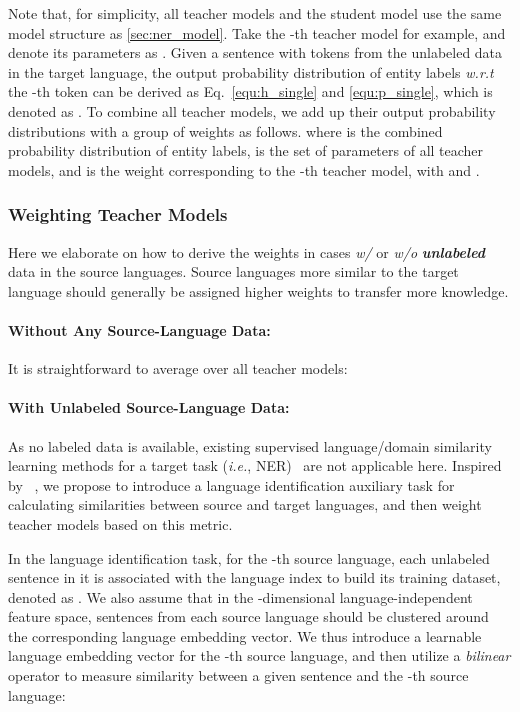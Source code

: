 \documentclass[11pt,a4paper]{article}
\newcommand\ie{\textit{i.e.}}
\newcommand\wrt{\textit{w.r.t}}
\begin{document}
	Note that, for simplicity, all teacher models and the student model use the same model structure as \ref{sec:ner_model}. 
	Take the -th teacher model for example, and denote its parameters as . Given a sentence  with  tokens from the unlabeled data  in the target language, the output probability distribution of entity labels \wrt{} the -th token  can be derived as Eq.~\ref{equ:h_single} and \ref{equ:p_single}, which is denoted as .
To combine all teacher models, we add up their output probability distributions with a group of weights  as follows. 
	where  is the combined probability distribution of entity labels,  is the set of parameters of all teacher models, and  is the weight corresponding to the -th teacher model, with  and .
	
	\subsubsection{Weighting Teacher Models}
	Here we elaborate on how to derive the weights  in cases \textit{w/} or \textit{w/o} \textbf{\textit{unlabeled}} data in the source languages. Source languages more similar to the target language should generally be assigned higher weights to transfer more knowledge. 

	\paragraph{Without Any Source-Language Data: } 
It is straightforward to average over all teacher models:
	
	
	\paragraph{With Unlabeled Source-Language Data: } 
As no labeled data is available, existing supervised language/domain similarity learning methods for a target task (\ie, NER)~\cite{mcclosky2010} are not applicable here. Inspired by ~\citet{pinheiro2018unsupervised}, we propose to introduce a language identification auxiliary task for calculating similarities between source and target languages, and then weight teacher models based on this metric. 

	In the language identification task, for the -th source language, each unlabeled sentence  in it is associated with the language index  to build its training dataset, denoted as  . 
	We also assume that in the -dimensional language-independent feature space, sentences from each source language should be clustered around the corresponding language embedding vector.  
We thus introduce a learnable language embedding vector  for the -th source language, and then utilize a \textit{bilinear} operator to measure similarity between a given sentence  and the -th source language:
	
\end{document}
